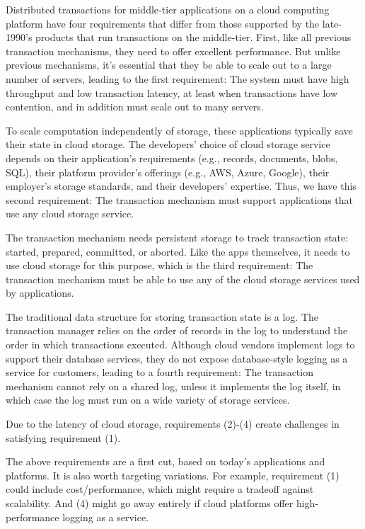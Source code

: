 \documentclass[11pt]{article}
\begin{document}
Distributed transactions for middle-tier applications on a cloud computing platform have four requirements that differ from those supported by the late-1990's products that run transactions on the middle-tier. First, like all previous transaction mechanisms, they need to offer excellent performance. But unlike previous mechanisms, it's essential that they be able to scale out to a large number of servers, leading to the first requirement: The system must have high throughput and low transaction latency, at least when transactions have low contention, and in addition must scale out to many servers.  

To scale computation independently of storage, these applications typically save their state in cloud storage. The developers' choice of cloud storage service depends on their application's requirements (e.g., records, documents, blobs, SQL), their platform provider's offerings (e.g., AWS, Azure, Google), their employer's storage standards, and their developers' expertise. Thus, we have this second requirement: The transaction mechanism must support applications that use any cloud storage service.  

The transaction mechanism needs persistent storage to track transaction state: started, prepared, committed, or aborted. Like the apps themselves, it needs to use cloud storage for this purpose, which is the third requirement: The transaction mechanism must be able to use any of the cloud storage services used by applications. 

The traditional data structure for storing transaction state is a log. The transaction manager relies on the order of records in the log to understand the order in which transactions executed. Although cloud vendors implement logs to support their database services, they do not expose database-style logging as a service for customers, leading to a fourth requirement: The transaction mechanism cannot rely on a shared log, unless it implements the log itself, in which case the log must run on a wide variety of storage services. 
 
Due to the latency of cloud storage, requirements (2)-(4) create challenges in satisfying requirement (1). 

The above requirements are a first cut, based on today's applications and platforms. It is also worth targeting variations. For example, requirement (1) could include cost/performance, which might require a tradeoff against scalability. And (4) might go away entirely if cloud platforms offer high-performance logging as a service. 
\end{document}
